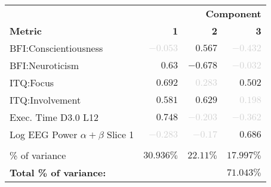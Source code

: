 \setlength{\tabcolsep}{0pt} %
\begin{tabular*}{\columnwidth}{@{\extracolsep{\fill}\quad}lrrr@{}}
\textbf{}                                    & \multicolumn{3}{r}{\textbf{Component}}     \\
\multicolumn{1}{l}{\textbf{Metric}}          & \textbf{1}   & \textbf{2}   & \textbf{3}   \\ \toprule
\multicolumn{1}{l}{BFI:\@ Conscientiousness} & \textcolor{lightgray}{\( -0.053 \)} & \( 0.567 \)  & \textcolor{lightgray}{\( -0.432 \)} \\
\multicolumn{1}{l}{BFI:\@ Neuroticism}       & \( 0.63 \)   & \( -0.678 \) & \textcolor{lightgray}{\( -0.032 \)} \\
\multicolumn{1}{l}{ITQ:\@ Focus}             & \( 0.692 \)  & \textcolor{lightgray}{\( 0.283 \)}  & \( 0.502 \)  \\
\multicolumn{1}{l}{ITQ:\@ Involvement}       & \( 0.581 \)  & \( 0.629 \)  & \textcolor{lightgray}{\( 0.198 \)}  \\
\multicolumn{1}{l}{Exec. Time D3.0 L12}      & \( 0.748 \)  & \textcolor{lightgray}{\( -0.203 \)} & \textcolor{lightgray}{\( -0.362 \)} \\
\multicolumn{1}{l}{Log EEG Power \( \alpha + \beta \) Slice 1} & \textcolor{lightgray}{\( -0.283 \)} & \textcolor{lightgray}{\( -0.17 \)} & \( 0.686 \) \\ %
& & & \\
\multicolumn{1}{l}{\% of variance} & \( 30.936\% \) & \( 22.11\% \) & \( 17.997\% \) \\ \midrule
\multicolumn{1}{l}{\textbf{Total \% of variance:}} & \multicolumn{3}{r}{\( 71.043\% \)} \\ \bottomrule
\end{tabular*}